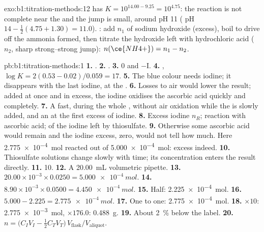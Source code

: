\begin{solution}{exo:b1:titration-methods:12}
 has $K = 10^{14.00 - 9.25} = 10^{4.75}$: the
reaction is not complete near the  and the jump is small,
around pH 11 ( pH $14 - \frac12(4.75 + 1.30) = 11.0$). : add $n_1$ of sodium hydroxide (excess), boil to drive off the
ammonia formed, then titrate the hydroxide left with hydrochloric acid
($n_2$, sharp strong--strong jump): $n(\ce{NH4+}) = n_1 - n_2$.
\end{solution}

\begin{solution}{pb:b1:titration-methods:1}
\textbf{1.} .
\textbf{2.} .
\textbf{3.} 0 and $-$I.
\textbf{4.} , $\log K = 2(0.53 - 0.02)/0.059
= 17$.
\textbf{5.} The blue colour needs iodine; it disappears with the last
iodine, at the .
\textbf{6.} Losses to air would lower the result; added at once and in
excess, the iodine oxidises the ascorbic acid quickly and completely.
\textbf{7.} A fast,  during the whole ,
without air oxidation while the  is slowly added, and an 
at the first excess of iodine.
\textbf{8.} Excess iodine $n_R$; reaction with ascorbic acid;  of
the iodine left by thiosulfate.
\textbf{9.} Otherwise some ascorbic acid would remain and the iodine
excess, zero, would not tell how much. Here
\qty{2.775e-4}{mol} reacted out of \qty{5.000e-4}{mol}: excess indeed.
\textbf{10.} Thiosulfate solutions change slowly with time; its
concentration enters the result directly.
\textbf{11.} 10.
\textbf{12.} A \qty{20.00}{mL} volumetric pipette.
\textbf{13.} $20.00 \times 10^{-3} \times 0.0250 = \qty{5.000e-4}{mol}$.
\textbf{14.} $8.90 \times 10^{-3} \times 0.0500 = \qty{4.450e-4}{mol}$.
\textbf{15.} Half: \qty{2.225e-4}{mol}.
\textbf{16.} $5.000 - 2.225 = \qty{2.775e-4}{mol}$.
\textbf{17.} One to one: \qty{2.775e-4}{mol}.
\textbf{18.} $\times 10$: \qty{2.775e-3}{mol}, $\times 176.0$:
\qty{0.488}{g}.
\textbf{19.} About \qty{2}{\percent} below the label.
\textbf{20.} $n = \bigl(C_IV_I - \frac12C_TV_T\bigr)\,V_{\mathrm{flask}}/V_{\mathrm{aliquot}}$.

\end{solution}
